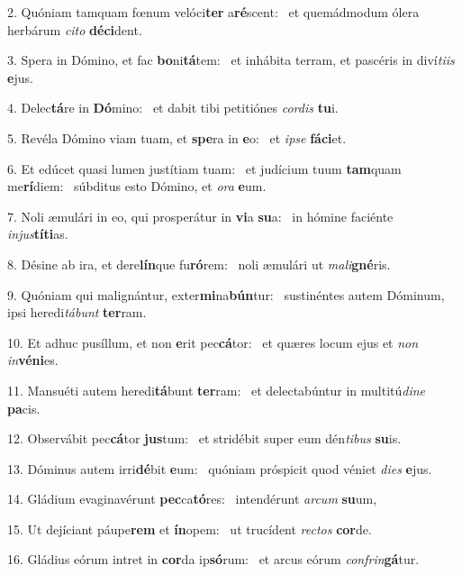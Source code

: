 2. Quóniam tamquam fœnum velóci\textbf{ter} a\textbf{ré}scent: \ast\  et quemádmodum ólera herbárum \textit{ci}\textit{to} \textbf{dé}\textbf{ci}dent.\

3. Spera in Dómino, et fac \textbf{bo}ni\textbf{tá}tem: \ast\  et inhábita terram, et pascéris in diví\textit{ti}\textit{is} \textbf{e}jus.\

4. Delec\textbf{tá}re in \textbf{Dó}mino: \ast\  et dabit tibi petitiónes \textit{cor}\textit{dis} \textbf{tu}i.\

5. Revéla Dómino viam tuam, et \textbf{spe}ra in \textbf{e}o: \ast\  et \textit{ip}\textit{se} \textbf{fá}\textbf{ci}et.\

6. Et edúcet quasi lumen justítiam tuam: \dag\  et judícium tuum \textbf{tam}quam me\textbf{rí}diem: \ast\  súbditus esto Dómino, et \textit{o}\textit{ra} \textbf{e}um.\

7. Noli æmulári in eo, qui prosperátur in \textbf{vi}a \textbf{su}a: \ast\  in hómine faciénte \textit{in}\textit{jus}\textbf{tí}\textbf{ti}as.\

8. Désine ab ira, et dere\textbf{lín}que fu\textbf{ró}rem: \ast\  noli æmulári ut \textit{ma}\textit{li}\textbf{gné}ris.\

9. Quóniam qui malignántur, exter\textbf{mi}na\textbf{bún}tur: \ast\  sustinéntes autem Dóminum, ipsi heredi\textit{tá}\textit{bunt} \textbf{ter}ram.\

10. Et adhuc pusíllum, et non \textbf{e}rit pec\textbf{cá}tor: \ast\  et quæres locum ejus et \textit{non} \textit{in}\textbf{vé}\textbf{ni}es.\

11. Mansuéti autem heredi\textbf{tá}bunt \textbf{ter}ram: \ast\  et delectabúntur in multitú\textit{di}\textit{ne} \textbf{pa}cis.\

12. Observábit pec\textbf{cá}tor \textbf{jus}tum: \ast\  et stridébit super eum dén\textit{ti}\textit{bus} \textbf{su}is.\

13. Dóminus autem irri\textbf{dé}bit \textbf{e}um: \ast\  quóniam próspicit quod véniet \textit{di}\textit{es} \textbf{e}jus.\

14. Gládium evaginavérunt \textbf{pec}ca\textbf{tó}res: \ast\  intendérunt \textit{ar}\textit{cum} \textbf{su}um,\

15. Ut dejíciant páupe\textbf{rem} et \textbf{ín}opem: \ast\  ut trucídent \textit{rec}\textit{tos} \textbf{cor}de.\

16. Gládius eórum intret in \textbf{cor}da ip\textbf{só}rum: \ast\  et arcus eórum \textit{con}\textit{frin}\textbf{gá}tur.\

